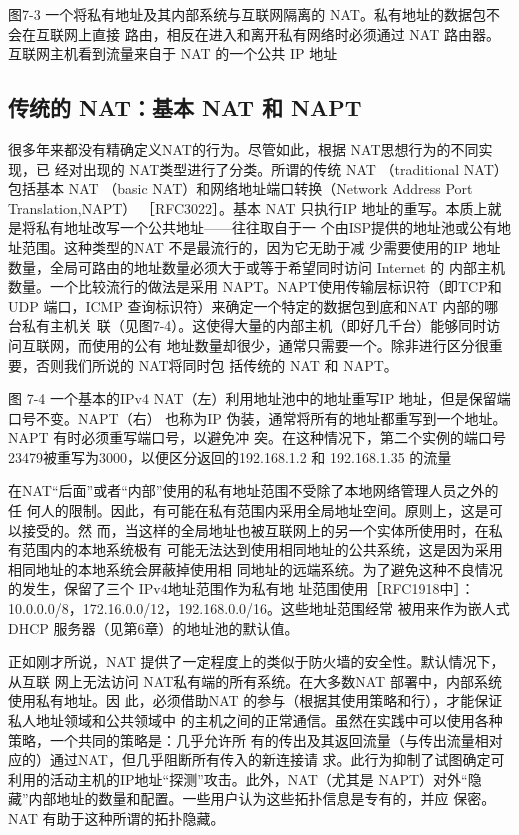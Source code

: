图7-3 一个将私有地址及其内部系统与互联网隔离的 NAT。私有地址的数据包不会在互联网上直接
路由，相反在进入和离开私有网络时必须通过 NAT 路由器。互联网主机看到流量来自于 NAT
的一个公共 IP 地址

\subsection{传统的 NAT：基本 NAT 和 NAPT}

很多年来都没有精确定义NAT的行为。尽管如此，根据 NAT思想行为的不同实现，已
经对出现的 NAT类型进行了分类。所谓的传统 NAT （traditional NAT）包括基本 NAT （basic
NAT）和网络地址端口转换（Network Address Port Translation,NAPT） ［RFC3022］。基本
NAT 只执行IP 地址的重写。本质上就是将私有地址改写一个公共地址——往往取自于一
个由ISP提供的地址池或公有地址范围。这种类型的NAT 不是最流行的，因为它无助于减
少需要使用的IP 地址数量，全局可路由的地址数量必须大于或等于希望同时访问 Internet 的
内部主机数量。一个比较流行的做法是采用 NAPT。NAPT使用传输层标识符（即TCP和
UDP 端口，ICMP 查询标识符）来确定一个特定的数据包到底和NAT 内部的哪台私有主机关
联（见图7-4）。这使得大量的内部主机（即好几千台）能够同时访问互联网，而使用的公有
地址数量却很少，通常只需要一个。除非进行区分很重要，否则我们所说的 NAT将同时包
括传统的 NAT 和 NAPT。

图 7-4
一个基本的IPv4 NAT（左）利用地址池中的地址重写IP 地址，但是保留端口号不变。NAPT（右）
也称为IP 伪装，通常将所有的地址都重写到一个地址。NAPT 有时必须重写端口号，以避免冲
突。在这种情况下，第二个实例的端口号23479被重写为3000，以便区分返回的192.168.1.2 和
192.168.1.35 的流量

在NAT“后面”或者“内部”使用的私有地址范围不受除了本地网络管理人员之外的任
何人的限制。因此，有可能在私有范围内采用全局地址空间。原则上，这是可以接受的。然
而，当这样的全局地址也被互联网上的另一个实体所使用时，在私有范围内的本地系统极有
可能无法达到使用相同地址的公共系统，这是因为采用相同地址的本地系统会屏蔽掉使用相
同地址的远端系统。为了避免这种不良情况的发生，保留了三个 IPv4地址范围作为私有地
址范围使用［RFC1918中］：10.0.0.0/8，172.16.0.0/12，192.168.0.0/16。这些地址范围经常
被用来作为嵌人式 DHCP 服务器（见第6章）的地址池的默认值。

正如刚才所说，NAT 提供了一定程度上的类似于防火墙的安全性。默认情况下，从互联
网上无法访问 NAT私有端的所有系统。在大多数NAT 部署中，内部系统使用私有地址。因
此，必须借助NAT 的参与（根据其使用策略和行），才能保证私人地址领域和公共领域中
的主机之间的正常通信。虽然在实践中可以使用各种策略，一个共同的策略是：几乎允许所
有的传出及其返回流量（与传出流量相对应的）通过NAT，但几乎阻断所有传入的新连接请
求。此行为抑制了试图确定可利用的活动主机的IP地址“探测”攻击。此外，NAT（尤其是
NAPT）对外“隐藏”内部地址的数量和配置。一些用户认为这些拓扑信息是专有的，并应
保密。NAT 有助于这种所谓的拓扑隐藏。

